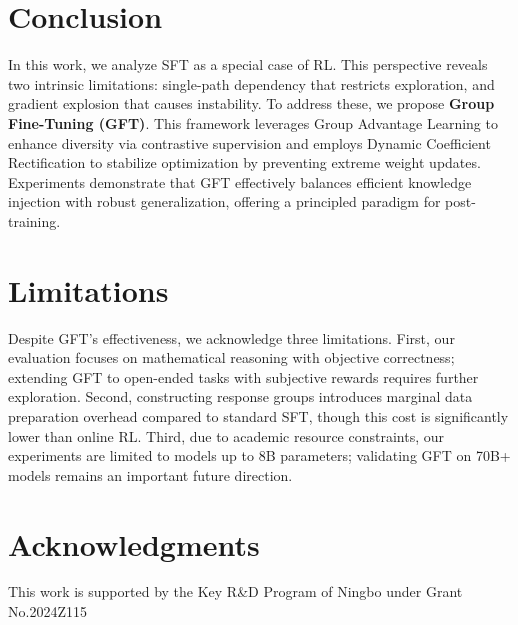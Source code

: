 \section{Conclusion}
In this work, we analyze SFT as a special case of RL. This perspective reveals two intrinsic limitations: single-path dependency that restricts exploration, and gradient explosion that causes instability. To address these, we propose \textbf{Group Fine-Tuning (GFT)}. This framework leverages Group Advantage Learning to enhance diversity via contrastive supervision and employs Dynamic Coefficient Rectification to stabilize optimization by preventing extreme weight updates. Experiments demonstrate that GFT effectively balances efficient knowledge injection with robust generalization, offering a principled paradigm for post-training.

\section{Limitations}
Despite GFT's effectiveness, we acknowledge three limitations. First, our evaluation focuses on mathematical reasoning with objective correctness; extending GFT to open-ended tasks with subjective rewards requires further exploration. Second, constructing response groups introduces marginal data preparation overhead compared to standard SFT, though this cost is significantly lower than online RL. Third, due to academic resource constraints, our experiments are limited to models up to 8B parameters; validating GFT on 70B+ models remains an important future direction.

\newpage
\section*{Acknowledgments}
This work is supported by the Key R\&D Program of Ningbo under Grant No.2024Z115



